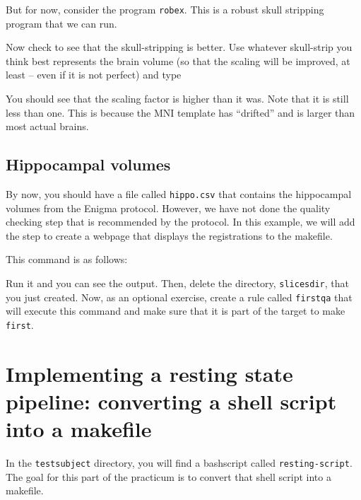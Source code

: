 But for now, consider the program \texttt{robex}. This is a robust
skull stripping program \citep{Iglesias2011} that we can run.

Now check to see that the skull-stripping is better. Use whatever skull-strip you think best represents the brain volume (so that the scaling will be improved, at least -- even if it is not perfect) and type 

You should see that the scaling factor is higher than it
was. Note that it is still less than one. This is because the MNI
template has ``drifted'' and is larger than most actual brains. 

\subsection{Hippocampal volumes}
By now, you should have a file called \texttt{hippo.csv} that contains the hippocampal volumes from the Enigma protocol. However, we have not done the quality checking step that is recommended by the protocol. In this example, we will add the step to create a webpage that displays the registrations to the makefile.

This command is as follows:

Run it and you can see the output. Then, delete the directory, \texttt{slicesdir}, that you just created. Now, as an optional exercise, create a rule called \texttt{firstqa} that will execute this command and make sure that it is part of the target to make \texttt{first}.

\section{Implementing a resting state pipeline: converting a shell script into a makefile}

In the \texttt{testsubject} directory, you will find a bashscript called \texttt{resting-script}. The goal for this part of the practicum is to convert that shell script into a makefile. 

